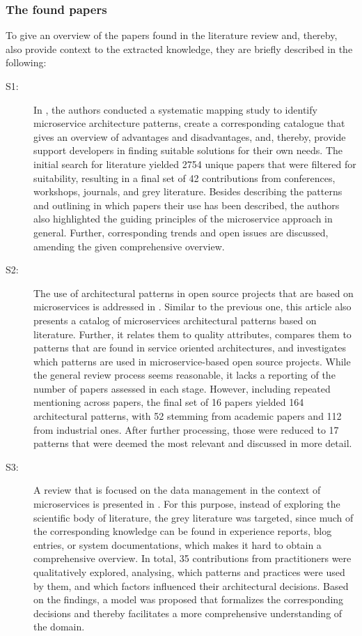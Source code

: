 \documentclass{bmcart}
\begin{document}
\subsubsection{The found papers}

To give an overview of the papers found in the literature review and, thereby, also provide context to the extracted knowledge, they are briefly described in the following:

\begin{description}
  \item[S1:] In \cite{Taibi.2018}, the authors conducted a systematic mapping study to identify microservice architecture patterns, create a corresponding catalogue that gives an overview of advantages and disadvantages, and, thereby, provide support developers in finding suitable solutions for their own needs. The initial search for literature yielded 2754 unique papers that were filtered for suitability, resulting in a final set of 42 contributions from conferences, workshops, journals, and grey literature. Besides describing the patterns and outlining in which papers their use has been described, the authors also highlighted the guiding principles of the microservice approach in general. Further, corresponding trends and open issues are discussed, amending the given comprehensive overview.
  \item[S2:] The use of architectural patterns in open source projects that are based on microservices is addressed in \cite{Marquez.2018}. Similar to the previous one, this article also presents a catalog of microservices architectural patterns based on literature. Further, it relates them to quality attributes, compares them to patterns that are found in service oriented architectures, and investigates which patterns are used in microservice-based open source projects. While the general review process seems reasonable, it lacks a reporting of the number of papers assessed in each stage. However, including repeated mentioning across papers, the final set of 16 papers yielded 164 architectural patterns, with 52 stemming from academic papers and 112 from industrial ones. After further processing, those were reduced to 17 patterns that were deemed the most relevant and discussed in more detail.
  \item[S3:] A review that is focused on the data management in the context of microservices is presented in \cite{Ntentos.2019}. For this purpose, instead of exploring the scientific body of literature, the grey literature was targeted, since much of the corresponding knowledge can be found in experience reports, blog entries, or system documentations, which makes it hard to obtain a comprehensive overview. In total, 35 contributions from practitioners were qualitatively explored, analysing, which patterns and practices were used by them, and which factors influenced their architectural decisions. Based on the findings, a model was proposed that formalizes the corresponding decisions and thereby facilitates a more comprehensive understanding of the domain.

\end{description}
\end{document}
